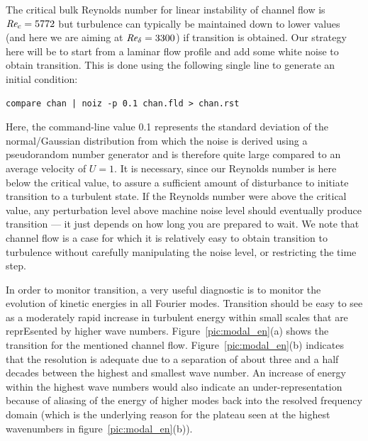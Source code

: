 \documentclass[11pt,a4paper]{report}
\def\Rey{\mbox{\it Re}}                             %
\begin{document}
The critical bulk Reynolds number for linear instability of channel
flow is $\Rey_c = 5772$ but turbulence can typically be maintained down
to lower values (and here we are aiming at $\Rey_\delta=3300$) if
transition is obtained. Our strategy here will be to start from a
laminar flow profile and add some white noise to obtain transition.
This is done using the following single line to generate an initial
condition: {\small
\begin{verbatim}
compare chan | noiz -p 0.1 chan.fld > chan.rst
\end{verbatim}
}

Here, the command-line value 0.1 represents the standard deviation of
the normal/Gaussian distribution from which the noise is derived using
a pseudorandom number generator and is therefore quite large compared
to an average velocity of $U=1$. It is necessary, since our Reynolds
number is here below the critical value, to assure a sufficient amount
of disturbance to initiate transition to a turbulent state. If the
Reynolds number were above the critical value, any perturbation level
above machine noise level should eventually produce transition --- it
just depends on how long you are prepared to wait. We note that
channel flow is a case for which it is relatively easy to obtain
transition to turbulence without carefully manipulating the noise
level, or restricting the time step.

In order to monitor transition, a very useful diagnostic is to monitor
the evolution of kinetic energies in all Fourier modes.  Transition
should be easy to see as a moderately rapid increase in turbulent
energy within small scales that are reprEsented by higher wave
numbers. Figure~\ref{pic:modal_en}(a) shows the transition for the
mentioned channel flow. Figure~\ref{pic:modal_en}(b) indicates that
the resolution is adequate due to a separation of about three and a
half decades between the highest and smallest wave number. An increase
of energy within the highest wave numbers would also indicate an
under-representation because of aliasing of the energy of higher modes
back into the resolved frequency domain (which is the underlying
reason for the plateau seen at the highest wavenumbers in
figure~\ref{pic:modal_en}(b)).
\end{document}

